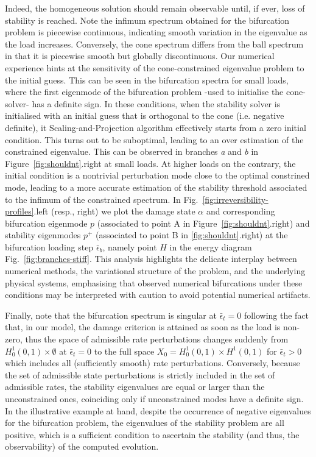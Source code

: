 \documentclass[10pt]{article}
\begin{document}
{        Indeed, the homogeneous solution should remain observable until, if ever, loss of stability is reached.
        Note the infimum spectrum obtained for the bifurcation problem is piecewise continuous, indicating smooth variation in the eigenvalue as the load increases.
        Conversely, the cone spectrum differs from the ball spectrum in that it is piecewise smooth but globally discontinuous.
        Our numerical experience hints at the sensitivity of the cone-constrained eigenvalue problem to the initial guess. This can be seen in the bifurcation spectra for small loads, where the first eigenmode of the bifurcation problem -used to initialise the cone-solver- has a definite sign.
        In these conditions, when the stability solver is initialised with an initial guess that is orthogonal to the cone (i.e. negative definite), it Scaling-and-Projection algorithm effectively starts from a zero initial condition.
        This turns out to be suboptimal, leading to an over estimation of the constrained eigenvalue. This can be observed in branches \emph{a} and \emph{b} in Figure~\ref{fig:shouldnt}.right at small loads.
        At higher loads on the contrary, the initial condition is a nontrivial perturbation mode close to the optimal constrined mode, leading to a more accurate estimation of the stability threshold associated to the infimum of the constrained spectrum.
        In Fig.~\ref{fig:irreversibility-profiles}.left (resp., right) we plot the damage state $\alpha$ and corresponding bifurcation eigenmode $p$ (associated to point A in Figure~\ref{fig:shouldnt}.right) and stability eigenmodes $p^+$ (associated to point B in \ref{fig:shouldnt}.right) at the bifurcation loading step $\bar \epsilon_b$, namely point $H$ in the energy diagram Fig.~\ref{fig:branches-stiff}.
        This analysis highlights the delicate interplay between numerical methods, the variational structure of the problem, and the underlying physical systems, emphasising that observed numerical bifurcations under these conditions may be interpreted with caution to avoid potential numerical artifacts.
    }

Finally, note that the bifurcation spectrum is singular at $\bar \epsilon_t=0$ following the fact that, in our model, the damage criterion is attained as soon as the load is non-zero, thus the space of admissible rate perturbations changes suddenly from $H^1_0(0,1) \times \emptyset$ at $\bar \epsilon_t=0$ to the full space $X_0 = H^1_0(0, 1)\times H^1(0, 1)$ for $\bar \epsilon_t>0$ which includes all (sufficiently smooth) rate perturbations.
Conversely, because the set of admissible state perturbations is strictly included in the set of admissible rates, the stability eigenvalues are equal or larger than the unconstrained ones,  coinciding only if unconstrained modes have a definite sign.
%
%
In the illustrative example at hand, despite the occurrence of negative eigenvalues for the bifurcation problem, the eigenvalues of the stability problem are all positive, which is a sufficient condition to ascertain the stability (and thus, the observability) of the computed evolution.
\end{document}
